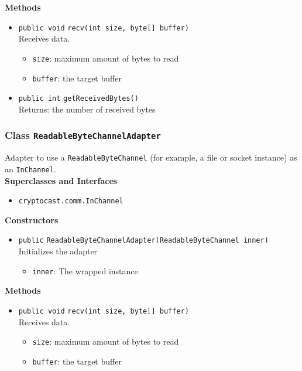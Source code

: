 \textbf{Methods}
\begin{itemize}
\item \lstinline|public void| \lstinline|recv|\lstinline|(int size, byte[] buffer)|\\
Receives data.
\begin{itemize}
\item \lstinline|size|: maximum amount of bytes to read
\item \lstinline|buffer|: the target buffer
\end{itemize}



\item \lstinline|public int| \lstinline|getReceivedBytes|\lstinline|()|\\
Returns: the number of received bytes



\end{itemize}

\subsubsection{Class \lstinline|ReadableByteChannelAdapter|}
Adapter to use a \lstinline|ReadableByteChannel| (for example, a file or socket instance) as an
 \lstinline|InChannel|. \\


\textbf{Superclasses and Interfaces}
\begin{itemize}
\item \lstinline|cryptocast.comm.InChannel|
\end{itemize}



\textbf{Constructors}
\begin{itemize}
\item \lstinline|public| \lstinline|ReadableByteChannelAdapter|\lstinline|(ReadableByteChannel inner)|\\
Initializes the adapter
\begin{itemize}
\item \lstinline|inner|: The wrapped instance
\end{itemize}



\end{itemize}


\textbf{Methods}
\begin{itemize}
\item \lstinline|public void| \lstinline|recv|\lstinline|(int size, byte[] buffer)|\\
Receives data.
\begin{itemize}
\item \lstinline|size|: maximum amount of bytes to read
\item \lstinline|buffer|: the target buffer
\end{itemize}



\end{itemize}

